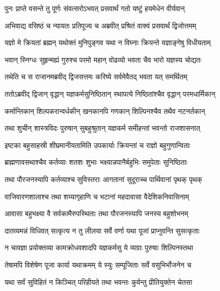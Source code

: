 
\twolineshloka
{पुनः प्राप्ते वसन्ते तु पूर्णः संवत्सरोऽभवत्}
{प्रसवार्थं गतो यष्टुं हयमेधेन वीर्यवान्} %

\twolineshloka
{अभिवाद्य वसिष्ठं च न्यायतः प्रतिपूज्य च}
{अब्रवीत् प्रश्रितं वाक्यं प्रसवार्थं द्विजोत्तमम्} %

\twolineshloka
{यज्ञो मे क्रियतां ब्रह्मन् यथोक्तं मुनिपुङ्गव}
{यथा न विघ्नाः क्रियन्ते यज्ञाङ्गेषु विधीयताम्} %

\twolineshloka
{भवान् स्निग्धः सुहृन्मह्यं गुरुश्च परमो महान्}
{वोढव्यो भवता चैव भारो यज्ञस्य चोद्यतः} %

\twolineshloka
{तथेति च स राजानमब्रवीद् द्विजसत्तमः}
{करिष्ये सर्वमेवैतद् भवता यत् समर्थितम्} %

\twolineshloka
{ततोऽब्रवीद् द्विजान् वृद्धान् यज्ञकर्मसुनिष्ठितान्}
{स्थापत्ये निष्ठितांश्चैव वृद्धान् परमधार्मिकान्} %

\twolineshloka
{कर्मान्तिकान् शिल्पकरान्वर्धकीन् खनकानपि}
{गणकान् शिल्पिनश्चैव तथैव नटनर्तकान्} %

\twolineshloka
{तथा शुचीन् शास्त्रविदः पुरुषान् सुबहुश्रुतान्}
{यज्ञकर्म समीहन्तां भवन्तो राजशासनात्} %

\twolineshloka
{इष्टका बहुसाहस्री शीघ्रमानीयतामिति}
{उपकार्याः क्रियन्तां च राज्ञो बहुगुणान्विताः} %

\twolineshloka
{ब्राह्मणावसथाश्चैव कर्तव्याः शतशः शुभाः}
{भक्ष्यान्नपानैर्बहुभिः समुपेताः सुनिष्ठिताः} %

\twolineshloka
{तथा पौरजनस्यापि कर्तव्याश्च सुविस्तराः}
{आगतानां सुदूराच्च पार्थिवानां पृथक् पृथक्} %

\twolineshloka
{वाजिवारणशालाश्च तथा शय्यागृहाणि च}
{भटानां महदावासा वैदेशिकनिवासिनाम्} %

\twolineshloka
{आवासा बहुभक्ष्या वै सर्वकामैरुपस्थिताः}
{तथा पौरजनस्यापि जनस्य बहुशोभनम्} %

\twolineshloka
{दातव्यमन्नं विधिवत् सत्कृत्य न तु लीलया}
{सर्वे वर्णा यथा पूजां प्राप्नुवन्ति सुसत्कृताः} %

\twolineshloka
{न चावज्ञा प्रयोक्तव्या कामक्रोधवशादपि}
{यज्ञकर्मसु ये व्यग्राः पुरुषाः शिल्पिनस्तथा} %

\twolineshloka
{तेषामपि विशेषेण पूजा कार्या यथाक्रमम्}
{ये स्युः सम्पूजिताः सर्वे वसुभिर्भोजनेन च} %

\twolineshloka
{यथा सर्वं सुविहितं न किञ्चित् परिहीयते}
{तथा भवन्तः कुर्वन्तु प्रीतियुक्तेन चेतसा} %

